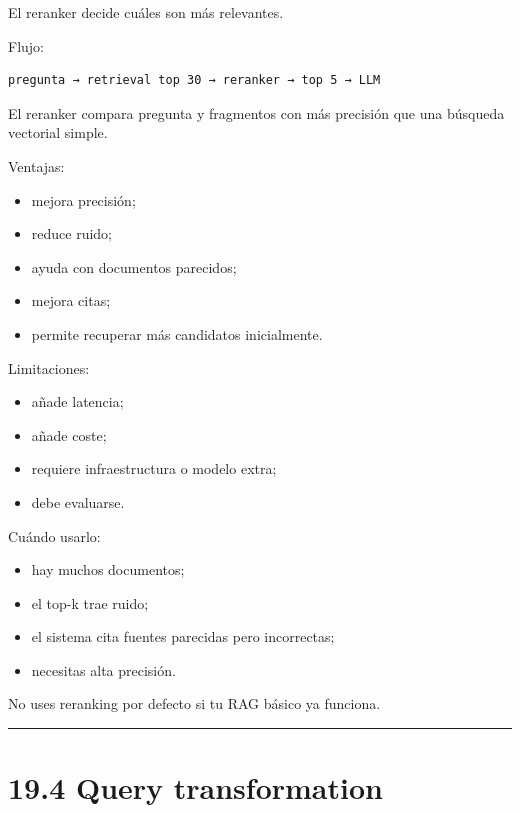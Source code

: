 El reranker decide cuáles son más relevantes.

Flujo:

\begin{lstlisting}
pregunta → retrieval top 30 → reranker → top 5 → LLM
\end{lstlisting}

El reranker compara pregunta y fragmentos con más precisión que una
búsqueda vectorial simple.

Ventajas:

\begin{itemize}
\tightlist
\item
  mejora precisión;
\item
  reduce ruido;
\item
  ayuda con documentos parecidos;
\item
  mejora citas;
\item
  permite recuperar más candidatos inicialmente.
\end{itemize}

Limitaciones:

\begin{itemize}
\tightlist
\item
  añade latencia;
\item
  añade coste;
\item
  requiere infraestructura o modelo extra;
\item
  debe evaluarse.
\end{itemize}

Cuándo usarlo:

\begin{itemize}
\tightlist
\item
  hay muchos documentos;
\item
  el top-k trae ruido;
\item
  el sistema cita fuentes parecidas pero incorrectas;
\item
  necesitas alta precisión.
\end{itemize}

No uses reranking por defecto si tu RAG básico ya funciona.

\begin{center}\rule{0.5\linewidth}{0.5pt}\end{center}

\section{19.4 Query transformation}\label{query-transformation-1}

